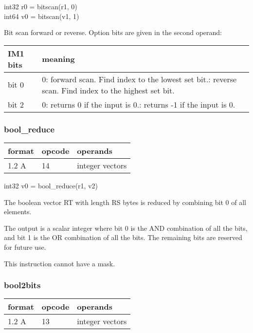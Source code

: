 \documentclass[forwardcom.tex]{subfiles}
\begin{document}
int32 r0 = bitscan(r1, 0)\\
int64 v0 = bitscan(v1, 1)
\vspace{2mm}

Bit scan forward or reverse. Option bits are given in the second operand:
\vspace{2mm}

\label{table:bitscanOptions}
\begin{tabular}{|p{16mm}|p{122mm}|}
\hline
\bfseries IM1 bits & \bfseries meaning \\ \hline
bit 0 & 0: forward scan. Find index to the lowest set bit.\newline
        1: reverse scan. Find index to the highest set bit.\\
\hline
bit 2 & 0: returns 0 if the input is 0.\newline
        1: returns -1 if the input is 0.\\ \hline
\end{tabular}
\vspace{2mm}


\subsubsection{bool\_reduce}
\label{table:boolReduceInstruction}
\begin{tabular}{|p{12mm}|p{12mm}|p{110mm}|}
\hline
\bfseries format & \bfseries opcode & \bfseries operands \\ \hline
1.2 A & 14 & integer vectors \\ \hline
\end{tabular}
\vspace{2mm}

int32 v0 = bool\_reduce(r1, v2)
\vspace{2mm}

The boolean vector RT with length RS bytes is reduced by combining bit 0 of all elements.

The output is a scalar integer where bit 0 is the AND combination of all the bits, and bit
1 is the OR combination of all the bits. The remaining bits are reserved for future use.
\vspace{2mm}

This instruction cannot have a mask.


\subsubsection{bool2bits}
\label{table:bool2bitsInstruction}
\begin{tabular}{|p{12mm}|p{12mm}|p{110mm}|}
\hline
\bfseries format & \bfseries opcode & \bfseries operands \\ \hline
1.2 A & 13 & integer vectors \\ \hline
\end{tabular}
\vspace{2mm}
\end{document}
